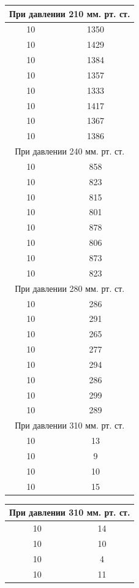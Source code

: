 \documentclass[a4paper,14pt]{extarticle}
\begin{document}
	\begin{table}[h!]
			\centering
		\begin{tabular}{|c|c|}
		\hline		
					\multicolumn{2}{|c|}{При давлении 210 мм. рт. ст.}\\ \hline
					10	&	1350	\\ \hline
					10	&	1429	\\ \hline
					10	&	1384	\\ \hline
					10	&	1357	\\ \hline
					10	&	1333	\\ \hline
					10	&	1417	\\ \hline
					10	&	1367	\\ \hline
					10	&	1386	\\ \hline
					\multicolumn{2}{|c|}{При давлении 240 мм. рт. ст.}\\ \hline
					10	&	858	\\ \hline
					10	&	823	\\ \hline
					10	&	815	\\ \hline
					10	&	801	\\ \hline
					10	&	878	\\ \hline
					10	&	806	\\ \hline
					10	&	873	\\ \hline
					10	&	823	\\ \hline
					\multicolumn{2}{|c|}{При давлении 280 мм. рт. ст.}\\ \hline
					10	&	286	\\ \hline
					10	&	291	\\ \hline
					10	&	265	\\ \hline
					10	&	277	\\ \hline
					10	&	294	\\ \hline
					10	&	286	\\ \hline
					10	&	299	\\ \hline
					10	&	289	\\ \hline
					\multicolumn{2}{|c|}{При давлении 310 мм. рт. ст.}\\ \hline
					10	&	13	\\ \hline
					10	&	9	\\ \hline
					10	&	10	\\ \hline
					10	&	15	\\ \hline
					
			
		\end{tabular}
		\begin{tabular}{|c|c|}
			\hline
			\multicolumn{2}{|c|}{При давлении 310 мм. рт. ст.}\\ \hline
			10	&	14	\\ \hline
			10	&	10	\\ \hline
			10	&	4	\\ \hline
			10	&	11	\\ \hline


\end{tabular}
\end{table}
\end{document}
